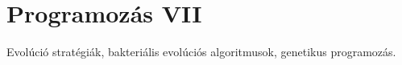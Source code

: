 \documentclass[../../main.tex]{subfiles}
\begin{document}
\section{Programozás VII}

\begin{fulltheorem}
	Evolúció stratégiák, bakteriális evolúciós algoritmusok, genetikus programozás.
\end{fulltheorem}
\end{document}
